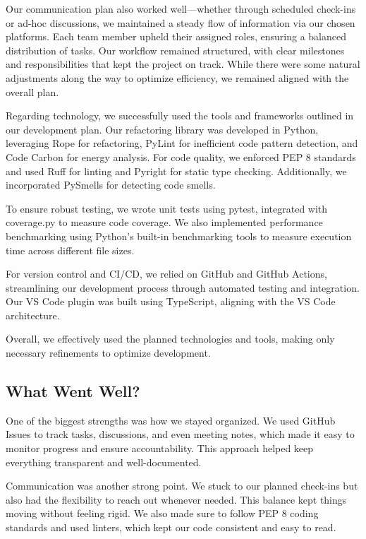 \documentclass{article}
\begin{document}
Our communication plan also worked well—whether through scheduled check-ins or ad-hoc 
discussions, we maintained a steady flow of information via our chosen platforms. Each 
team member upheld their assigned roles, ensuring a balanced distribution of tasks. Our 
workflow remained structured, with clear milestones and responsibilities that kept the 
project on track. While there were some natural adjustments along the way to optimize 
efficiency, we remained aligned with the overall plan.

Regarding technology, we successfully used the tools and frameworks outlined in our 
development plan. Our refactoring library was developed in Python, leveraging Rope for 
refactoring, PyLint for inefficient code pattern detection, and Code Carbon for energy 
analysis. For code quality, we enforced PEP 8 standards and used Ruff for linting and 
Pyright for static type checking. Additionally, we incorporated PySmells for detecting 
code smells.

To ensure robust testing, we wrote unit tests using pytest, integrated with coverage.py 
to measure code coverage. We also implemented performance benchmarking using Python’s 
built-in benchmarking tools to measure execution time across different file sizes.

For version control and CI/CD, we relied on GitHub and GitHub Actions, streamlining 
our development process through automated testing and integration. Our VS Code plugin 
was built using TypeScript, aligning with the VS Code architecture.

Overall, we effectively used the planned technologies and tools, making only necessary 
refinements to optimize development.

\subsection{What Went Well?}


One of the biggest strengths was how we stayed organized. We used GitHub Issues to track 
tasks, discussions, and even meeting notes, which made it easy to monitor progress and 
ensure accountability. This approach helped keep everything transparent and well-documented.

Communication was another strong point. We stuck to our planned check-ins but also had 
the flexibility to reach out whenever needed. This balance kept things moving without 
feeling rigid. We also made sure to follow PEP 8 coding standards and used linters, 
which kept our code consistent and easy to read.
\end{document}
